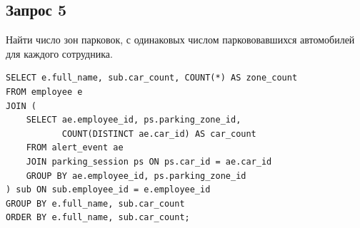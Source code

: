
\newpage


\subsection{Запрос 5}
Найти число зон парковок, с одинаковых числом паркововавшихся автомобилей для каждого сотрудника.
\begin{lstlisting}[style=sqlstyle, caption={Запрос 5}, label={lst:req5}]
SELECT e.full_name, sub.car_count, COUNT(*) AS zone_count
FROM employee e
JOIN (
    SELECT ae.employee_id, ps.parking_zone_id,
           COUNT(DISTINCT ae.car_id) AS car_count
    FROM alert_event ae
    JOIN parking_session ps ON ps.car_id = ae.car_id
    GROUP BY ae.employee_id, ps.parking_zone_id
) sub ON sub.employee_id = e.employee_id
GROUP BY e.full_name, sub.car_count
ORDER BY e.full_name, sub.car_count;
\end{lstlisting}

